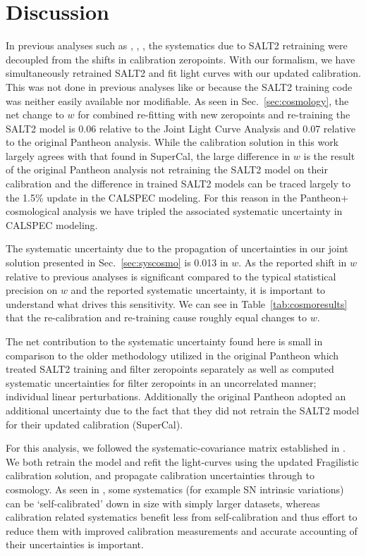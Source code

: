 \documentclass[twocolumn]{aastex63}
\newcommand{\blue}{\color{black}}
\begin{document}
 


\section{Discussion}
\label{sec:discussion}


In previous analyses such as \cite{Scolnic18}, \citealt{Jones19}, \cite{Brout18b}, the systematics due to SALT2 retraining were decoupled from the shifts in calibration zeropoints.  With our formalism, we have simultaneously retrained SALT2 and fit light curves with our updated calibration. {\blue This was not done in previous analyses like \cite{Scolnic18} or \cite{Brout18b} because the SALT2 training code was neither easily available nor modifiable.}  As seen in Sec.~\ref{sec:cosmology}, the net change to $w$ for combined re-fitting with new zeropoints and re-training the SALT2 model is 0.06 relative to the Joint Light Curve Analysis and 0.07 relative to the original Pantheon analysis. While the calibration solution in this work largely agrees with that found in SuperCal, the large difference in $w$ is the result of the original Pantheon analysis not retraining the SALT2 model on their calibration and the difference in trained SALT2 models can be traced largely to the 1.5\% update in the CALSPEC modeling. For this reason in the Pantheon+ cosmological analysis we have tripled the associated systematic uncertainty in CALSPEC modeling.

The systematic uncertainty due to the propagation of uncertainties in our joint solution presented in Sec.~\ref{sec:syscosmo} is 0.013 in $w$.  As the reported shift in $w$ relative to previous analyses is significant compared to the typical statistical precision on $w$ and the reported systematic uncertainty, it is important to understand what drives this sensitivity. We can see in Table~\ref{tab:cosmoresults} that the re-calibration and re-training cause roughly equal changes to $w$.  

The net contribution to the systematic uncertainty found here is small in comparison to the older methodology utilized in the original Pantheon which treated SALT2 training and filter zeropoints separately as well as computed systematic uncertainties for filter zeropoints in an uncorrelated manner; individual linear perturbations. Additionally the original Pantheon adopted an additional uncertainty due to the fact that they did not retrain the SALT2 model for their updated calibration (SuperCal).


{\blue For this analysis, we followed the systematic-covariance matrix established in \cite{Conley2010}.  We both retrain the model and refit the light-curves using the updated Fragilistic calibration solution, and propagate calibration uncertainties through to cosmology.  As seen in \cite{binningissinning}, some systematics (for example SN intrinsic variations) can be `self-calibrated' down in size with simply larger datasets, whereas calibration related systematics benefit less from self-calibration and thus effort to reduce them with improved calibration measurements and accurate accounting of their uncertainties is important.}
\end{document}
